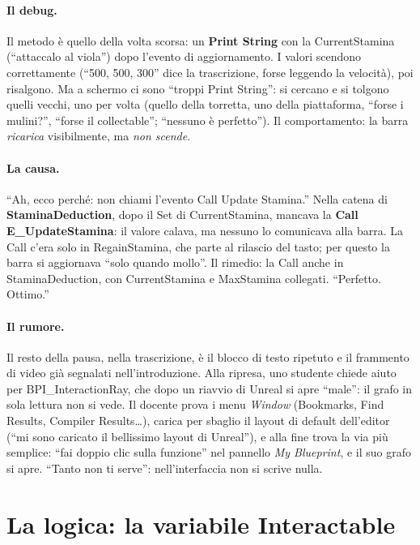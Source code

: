 \paragraph{Il debug.} Il metodo è quello della volta scorsa: un \textbf{Print String} con la
CurrentStamina (``attaccalo al viola'') dopo l'evento di aggiornamento. I valori scendono
correttamente (``500, 500, 300'' dice la trascrizione, forse leggendo la velocità), poi
risalgono. Ma a schermo ci sono ``troppi Print String'': si cercano e si tolgono quelli
vecchi, uno per volta (quello della torretta, uno della piattaforma, ``forse i mulini?'',
``forse il collectable''; ``nessuno è perfetto''). Il comportamento: la barra
\emph{ricarica} visibilmente, ma \emph{non scende}.

\paragraph{La causa.} ``Ah, ecco perché: non chiami l'evento Call Update Stamina.'' Nella
catena di \textbf{StaminaDeduction}, dopo il Set di CurrentStamina, mancava la
\textbf{Call E\_UpdateStamina}: il valore calava, ma nessuno lo comunicava alla barra. La
Call c'era solo in RegainStamina, che parte al rilascio del tasto; per questo la barra si
aggiornava ``solo quando mollo''. Il rimedio: la Call anche in StaminaDeduction, con
CurrentStamina e MaxStamina collegati. ``Perfetto. Ottimo.''

\paragraph{Il rumore.} Il resto della pausa, nella trascrizione, è il blocco di testo
ripetuto e il frammento di video già segnalati nell'introduzione. Alla ripresa, uno studente
chiede aiuto per BPI\_InteractionRay, che dopo un riavvio di Unreal si apre ``male'': il
grafo in sola lettura non si vede. Il docente prova i menu \emph{Window} (Bookmarks, Find
Results, Compiler Results\dots), carica per sbaglio il layout di default dell'editor
(``mi sono caricato il bellissimo layout di Unreal''), e alla fine trova la via più
semplice: ``fai doppio clic sulla funzione'' nel pannello \emph{My Blueprint}, e il suo
grafo si apre. ``Tanto non ti serve'': nell'interfaccia non si scrive nulla.

\section{La logica: la variabile Interactable}
\label{ue12:sec:logica}


